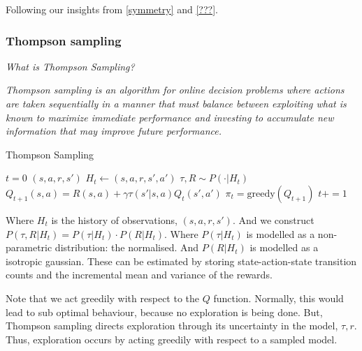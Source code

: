 Following our insights from \ref{symmetry} and \ref{???}.




\subsubsection{Thompson sampling}
\begin{displayquote}
	\textsl{What is Thompson Sampling?}
\end{displayquote}

\begin{displayquote}
	\textit{Thompson sampling is an algorithm for online decision problems where actions are taken sequentially in a manner that
must balance between exploiting what is known to maximize immediate performance and investing to accumulate
new information that may improve future performance.}\cite{Russo2017}
\end{displayquote}


\begin{algorithm}
	\caption{Thompson Sampling}
	\begin{algorithmic}[1]

		\State $t=0$
		\State $(s, a, r, s')$ 
		\State $H_t \leftarrow (s, a, r, s', a')$ 
		\State $\tau, R \sim P(\cdot | H_t)$ 
		\State $Q_{t+1}(s, a) = R(s, a) + \gamma \tau(s'| s, a) Q_t(s', a')$ 
		\State $\pi_t = \text{greedy}(Q_{t+1})$ 
		\State $t += 1$

		\EndWhile
		\State {}
		\EndProcedure

	\end{algorithmic}
\end{algorithm}

Where $H_t$ is the history of observations, $(s, a, r, s')$.
And we construct $P(\tau, R | H_t) = P(\tau | H_t) \cdot P(R | H_t)$. Where $P(\tau | H_t)$
is modelled as a non-parametric distribution: the normalised.
And $P(R | H_t)$ is modelled as a isotropic gaussian.
These can be estimated by storing state-action-state transition counts
and the incremental mean and variance of the rewards.

Note that we act greedily with respect to the $Q$ function. Normally, this would
lead to sub optimal behaviour, because no exploration is being done. But, Thompson sampling
directs exploration through its uncertainty in the model, $\tau, r$. Thus,
exploration occurs by acting greedily with respect to a sampled model.

